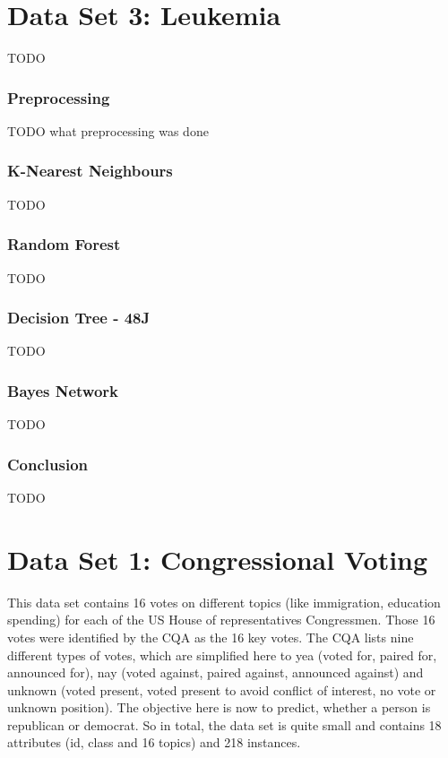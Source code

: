 \documentclass{article}
\begin{document}
\section{Data Set 3: Leukemia}
TODO\\
\subsubsection{Preprocessing}
TODO what preprocessing was done\\
\subsubsection{K-Nearest Neighbours}
TODO\\
\subsubsection{Random Forest}
TODO\\
\subsubsection{Decision Tree - 48J}
TODO\\
\subsubsection{Bayes Network}
TODO\\
\subsubsection{Conclusion}
TODO\\


\section{Data Set 1: Congressional Voting}

This data set contains 16 votes on different topics (like immigration, education spending) for each of the US House of representatives Congressmen. Those 16 votes were identified by the CQA as the 16 key votes. The CQA lists nine different types of votes, which are simplified here to yea (voted for, paired for, announced for), nay (voted against, paired against, announced against) and unknown (voted present, voted present to avoid conflict of interest, no vote or unknown position). The objective here is now to predict, whether a person is republican or democrat. 
So in total, the data set is quite small and contains 18 attributes (id, class and 16 topics) and 218 instances. 
\end{document}
